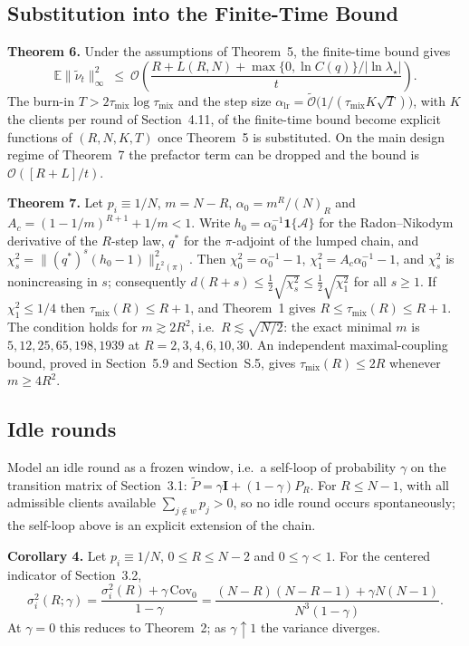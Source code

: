 \documentclass[twoside,11pt]{article}
\begin{document}
\subsection{Substitution into the Finite-Time Bound}
\textbf{Theorem 6.} Under the assumptions of Theorem~5, the finite-time bound \citep[Lemma~2]{ref1} gives
\begin{equation}\label{eq:e30}
\mathbb{E}\|\tilde\nu_t\|_\infty^{2} \ \leq\ \mathcal{O}\!\left(\dfrac{R+L(R,N)+\max\{0,\ln C(q)\}/|\ln\lambda_\star|}{t}\right).
\end{equation}
The burn-in $T>2\tau_{\mathrm{mix}}\log\tau_{\mathrm{mix}}$ and the step size
$\alpha_{\mathrm{lr}}=\widetilde{\mathcal{O}}\big(1/(\tau_{\mathrm{mix}}K\sqrt{T})\big)$,
with $K$ the clients per round of Section~4.11,
of the finite-time bound become explicit functions of $(R,N,K,T)$ once
Theorem~5 is substituted. On the main design regime of Theorem~7 the prefactor term can be dropped and the bound is $\mathcal{O}([R+L]/t)$.
\label{thm:substitute}

\textbf{Theorem 7.} Let $p_i\equiv1/N$, $m=N-R$, $\alpha_0=m^R/(N)_R$ and $A_c=(1-1/m)^{R+1}+1/m<1$. Write $h_0=\alpha_0^{-1}\mathbf{1}\{\mathcal{A}\}$ for the Radon--Nikodym derivative of the $R$-step law, $q^*$ for the $\pi$-adjoint of the lumped chain, and $\chi^2_s=\|(q^*)^s(h_0-1)\|_{L^2(\pi)}^2$. Then $\chi^2_0=\alpha_0^{-1}-1$, $\chi^2_1=A_c\alpha_0^{-1}-1$, and $\chi^2_s$ is nonincreasing in $s$; consequently $d(R+s)\le\tfrac12\sqrt{\chi^2_s}\le\tfrac12\sqrt{\chi^2_1}$ for all $s\geq1$. If $\chi^2_1\leq1/4$ then $\tau_{\mathrm{mix}}(R)\leq R+1$, and Theorem~1 gives $R\leq\tau_{\mathrm{mix}}(R)\leq R+1$. The condition holds for $m\gtrsim2R^2$, i.e.\ $R\lesssim\sqrt{N/2}$: the exact minimal $m$ is $5,12,25,65,198,1939$ at $R=2,3,4,6,10,30$. An independent maximal-coupling bound, proved in Section~5.9 and Section~S.5, gives $\tau_{\mathrm{mix}}(R)\leq2R$ whenever $m\geq4R^2$.

\subsection{Idle rounds}
Model an idle round as a frozen window, i.e.\ a self-loop of probability
$\gamma$ on the transition matrix of Section~3.1: $\widetilde P=\gamma\mathbf{I}+(1-\gamma)P_R$.
For $R\leq N-1$, with all admissible clients available $\sum_{j\notin w}p_j>0$, so no idle round occurs spontaneously; the self-loop above is an explicit extension of the chain.

\textbf{Corollary 4.} Let $p_i\equiv1/N$, $0\leq R\leq N-2$ and
$0\leq\gamma<1$. For the centered indicator of Section~3.2,
\begin{equation}\label{eq:e31}
\sigma_i^{2}(R;\gamma) =\dfrac{\sigma_i^{2}(R)+\gamma\,\mathrm{Cov}_0}{1-\gamma} =\dfrac{(N-R)(N-R-1)+\gamma N(N-1)}{N^{3}(1-\gamma)}.
\end{equation}
At $\gamma=0$ this reduces to Theorem~2; as $\gamma\uparrow1$ the variance
diverges.
\label{cor:idle}
\end{document}
